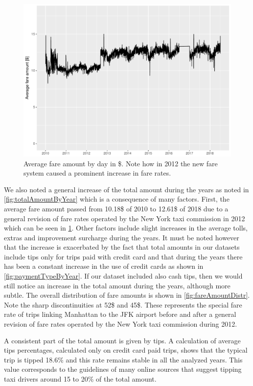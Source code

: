 \documentclass{acm_proc_article-sp-sigmod09}
\begin{document}
\begin{figure}
	\centering
	\includegraphics[width=1\columnwidth]{resources/base_plots/overall_fare_amount.pdf}
	\caption{Average fare amount by day in \$. Note how in 2012 the new fare system caused a prominent increase in fare rates.}
	\label{fig:overallFareAmount}
\end{figure}

We also noted a general increase of the total amount during the years as noted in \cref{fig:totalAmountByYear} which is a consequence of many factors. First, the average fare amount passed from 10.18\$ of 2010 to 12.61\$ of 2018 due to a general revision of fare rates operated by the New York taxi commission in 2012 which can be seen in \cref{fig:overallFareAmount}. Other factors include slight increases in the average tolls, extras and improvement surcharge during the years. It must be noted however that the increase is exacerbated by the fact that total amounts in our datasets include tips only for trips paid with credit card and that during the years there has been a constant increase in the use of credit cards as shown in \cref{fig:paymentTypeByYear}. If our dataset included also cash tips, then we would still notice an increase in the total amount during the years, although more subtle.
The overall distribution of fare amounts is shown in \cref{fig:fareAmountDistr}. Note the sharp discontinuities at 52\$ and 45\$. These represents the special fare rate of trips linking Manhattan to the JFK airport before and after a general revision of fare rates operated by the New York taxi commission during 2012.

A consistent part of the total amount is given by tips. A calculation of average tips percentages, calculated only on credit card paid trips, shows that the typical trip is tipped 18.6\% and this rate remains stable in all the analyzed years. This value corresponds to the guidelines of many online sources that suggest tipping taxi drivers around 15 to 20\% of the total amount.
\end{document}
